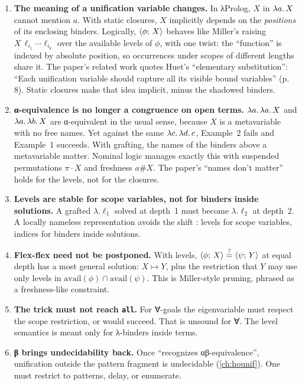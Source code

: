 \begin{enumerate}
  \item \textbf{The meaning of a unification variable changes.} In λProlog, $X$ in $\lambda a.\,X$
    cannot mention $a$. With static closures, $X$ implicitly depends on the \emph{positions} of its
    enclosing binders. Logically, $\langle \phi;\,X\rangle$ behaves like Miller's raising
    $X\,\ell_{i_1}\cdots\ell_{i_k}$ over the available levels of $\phi$, with one twist: the
    \enquote{function} is indexed by absolute position, so occurrences under scopes of different
    lengths share it. The paper's related work quotes Huet's \enquote{elementary substitution}:
    \enquote{Each unification variable should capture all its visible bound variables} (p.\,8).
    Static closures make that idea implicit, minus the shadowed binders.
  \item \textbf{α-equivalence is no longer a congruence on open terms.} $\lambda a.\,\lambda a.\,X$ and
    $\lambda a.\,\lambda b.\,X$ are α-equivalent in the usual sense, because $X$ is a metavariable with no
    free names. Yet against the same $\lambda c.\,\lambda d.\,c$, Example~2 fails and Example~1 succeeds.
    With grafting, the names of the binders above a metavariable matter. Nominal logic manages exactly
    this with suspended permutations $\pi\cdot X$ and freshness $a\#X$. The paper's \enquote{names
    don't matter} holds for the levels, not for the closures.
  \item \textbf{Levels are stable for scope variables, not for binders inside solutions.} A grafted
    $\lambda.\ell_1$ solved at depth~1 must become $\lambda.\ell_2$ at depth~2. A locally nameless
    representation avoids the shift \cite{McBrideMcKinna2004,Chargueraud2012}: levels for scope
    variables, indices for binders inside solutions.
  \item \textbf{Flex-flex need not be postponed.} With levels, $\langle \phi;\,X\rangle\stackrel{?}{=}\langle \psi;\,Y\rangle$
    at equal depth has a most general solution: $X\mapsto Y$, plus the restriction that $Y$ may use
    only levels in $\mathrm{avail}(\phi)\cap\mathrm{avail}(\psi)$. This is Miller-style pruning,
    phrased as a freshness-like constraint.
  \item \textbf{The trick must not reach \texttt{all}.} For ∀-goals the eigenvariable must respect the
    scope restriction, or  would succeed. That is unsound for ∀.
    The level semantics is meant only for λ-binders inside terms.
  \item \textbf{β brings undecidability back.} Once \scm{==} \enquote{recognizes αβ-equivalence},
    unification outside the pattern fragment is undecidable (\cref{ch:hounif}). One must restrict to
    patterns, delay, or enumerate.
\end{enumerate}

